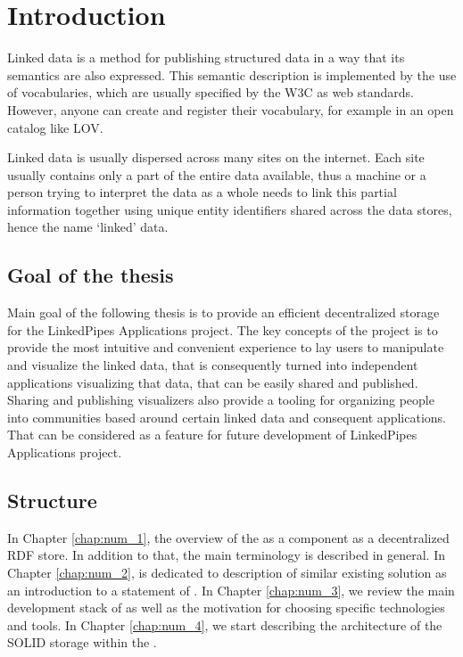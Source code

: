 \chapter*{Introduction}


Linked data is a method for publishing structured data in a way that its semantics are also expressed. This semantic description is implemented by the use of vocabularies, which are usually specified by the \acrshort{W3C} as web standards. However, anyone can create and register their vocabulary, for example in an open catalog like \acrshort{LOV}.

Linked data is usually dispersed across many sites on the internet. Each site usually contains only a part of the entire data available, thus a machine or a person trying to interpret the data as a whole needs to link this partial information together using unique entity identifiers shared across the data stores, hence the name `linked' data.


 
\section*{Goal of the thesis}
Main goal of the following thesis is to provide an efficient decentralized storage for the LinkedPipes Applications project. The key concepts of the project is to provide the most intuitive and convenient experience to lay users to manipulate and visualize the linked data, that is consequently turned into independent applications visualizing that data, that can be easily shared and published. Sharing and publishing visualizers also provide a tooling for organizing people into communities based around certain linked data and consequent applications. That can be considered as a feature for future development of LinkedPipes Applications project. 

\section*{Structure}

In Chapter \ref{chap:num_1}, the overview of the \lpa{} as a component as a decentralized RDF store. In addition to that, the main terminology is described in general. In Chapter \ref{chap:num_2}, is dedicated to description of similar existing solution as an introduction to a statement of \lpa{}. In Chapter \ref{chap:num_3}, we review the main development stack of \lpa{} as well as the motivation for choosing specific technologies and tools. In Chapter \ref{chap:num_4}, we start describing the architecture of the SOLID storage within the \lpa{}.